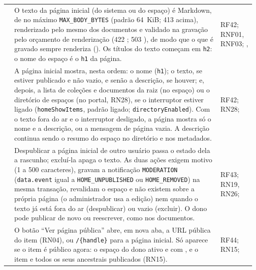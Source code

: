 \begin{longtable}{@{}L{1.3cm}L{9.6cm}L{2.8cm}@{}}
 & O texto da página inicial (do sistema ou do espaço) é Markdown, de no máximo \texttt{MAX\_BODY\_BYTES}  (padrão 64~KiB; 413 acima), renderizado pelo mesmo  dos documentos e validado na gravação pelo orçamento de renderização (422 ; 503 ), de modo que o que é gravado sempre renderiza (). Os títulos do texto começam em \texttt{h2}: o nome do espaço é o \texttt{h1} da página. & RF42; RNF01, RNF03; , \\[1pt]
 & A página inicial mostra, nesta ordem: o nome (\texttt{h1}); o texto, se estiver publicado e não vazio, e senão a descrição, se houver; e, depois, a lista de coleções e documentos da raiz (no espaço) ou o diretório de espaços (no portal, RN28), se o interruptor estiver ligado (\texttt{homeShowItems}, padrão ligado; \texttt{directoryEnabled}). Com o texto fora do ar e o interruptor desligado, a página mostra só o nome e a descrição, ou a mensagem de página vazia. A descrição continua sendo o resumo do espaço no diretório e nos metadados. & RF42; RN28; \\[1pt]
 & Despublicar a página inicial de outro usuário passa o estado dela a rascunho; excluí-la apaga o texto. As duas ações exigem motivo (1 a 500 caracteres), gravam a notificação \texttt{MODERATION} (\texttt{data.event} igual a \texttt{HOME\_UNPUBLISHED} ou \texttt{HOME\_REMOVED}) na mesma transação, revalidam o espaço e não existem sobre a própria página (o administrador usa a edição) nem quando o texto já está fora do ar (despublicar) ou vazio (excluir). O dono pode publicar de novo ou reescrever, como nos documentos. & RF43; RN19, RN26; \\[1pt]
 & O botão ``Ver página pública'' abre, em nova aba, a URL pública do item (RN04), ou \texttt{/\{handle\}} para a página inicial. Só aparece se o item é público agora: o espaço do dono ativo e com , e o item e todos os seus ancestrais publicados (RN15). & RF44; RN15; \\[1pt]
\end{longtable}

